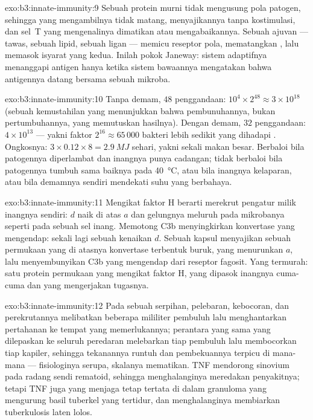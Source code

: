 \begin{solution}{exo:b3:innate-immunity:9}
Sebuah protein murni tidak mengusung pola patogen, sehingga  yang
mengambilnya tidak matang, menyajikannya tanpa kostimulasi, dan
sel~T yang mengenalinya dimatikan atau mengabaikannya. Sebuah ajuvan
--- tawas, sebuah lipid, sebuah ligan  --- memicu reseptor
pola, mematangkan , lalu memasok isyarat yang kedua.
Inilah pokok Janeway: sistem adaptifnya menanggapi antigen hanya
ketika sistem bawaannya mengatakan bahwa antigennya datang bersama sebuah mikroba.
\end{solution}

\begin{solution}{exo:b3:innate-immunity:10}
Tanpa demam, $48$ penggandaan: $10^{4}\times 2^{48} \approx 3\times
10^{18}$ (sebuah kemustahilan yang menunjukkan bahwa pembunuhannya, bukan
pertumbuhannya, yang memutuskan hasilnya). Dengan demam, $32$ penggandaan:
$4\times 10^{13}$ --- yakni faktor $2^{16} \approx 65\,000$ bakteri lebih sedikit
yang dihadapi . Ongkosnya: $3\times 0.12\times 8 = \qty{2.9}{MJ}$
sehari, yakni sekali makan besar. Berbaloi bila patogennya diperlambat dan
inangnya punya cadangan; tidak berbaloi bila patogennya tumbuh sama baiknya pada
\qty{40}{\celsius}, atau bila inangnya kelaparan, atau bila demamnya sendiri
mendekati suhu yang berbahaya.
\end{solution}

\begin{solution}{exo:b3:innate-immunity:11}
Mengikat faktor H berarti merekrut pengatur milik inangnya sendiri: $d$ naik di atas
$a$ dan gelungnya meluruh pada mikrobanya seperti pada sebuah sel inang. Memotong
C3b menyingkirkan konvertase yang mengendap: sekali lagi sebuah kenaikan $d$. Sebuah kapsul
menyajikan sebuah permukaan yang di atasnya konvertase terbentuk buruk, yang menurunkan $a$, lalu
menyembunyikan C3b yang mengendap dari reseptor fagosit. Yang termurah:
satu protein permukaan yang mengikat faktor H, yang dipasok inangnya cuma-cuma
dan yang mengerjakan tugasnya.
\end{solution}

\begin{solution}{exo:b3:innate-immunity:12}
Pada sebuah serpihan, pelebaran, kebocoran, dan perekrutannya melibatkan beberapa
mililiter pembuluh lalu menghantarkan pertahanan ke tempat yang memerlukannya; perantara
yang sama yang dilepaskan ke seluruh peredaran melebarkan tiap pembuluh lalu
membocorkan tiap kapiler, sehingga tekanannya runtuh dan pembekuannya
terpicu di mana-mana --- fisiologinya serupa, skalanya
mematikan. TNF mendorong  sinovium pada radang sendi rematoid,
sehingga menghalanginya meredakan penyakitnya; tetapi TNF juga yang menjaga
 tetap tertata di dalam granuloma yang mengurung basil tuberkel yang
tertidur, dan menghalanginya membiarkan tuberkulosis laten lolos.
\end{solution}

